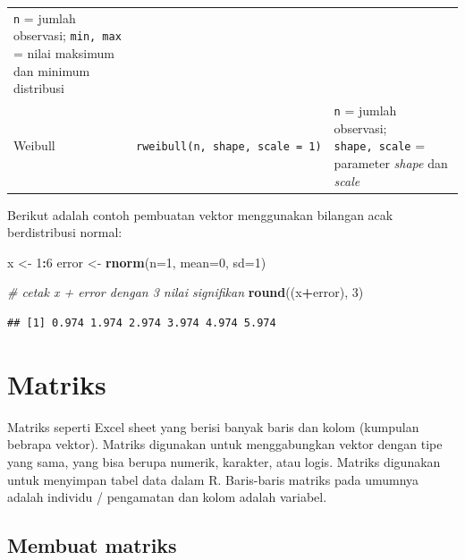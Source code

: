 \documentclass[]{book}
\newenvironment{Shaded}{\begin{snugshade}}{\end{snugshade}}
\newcommand{\CommentTok}[1]{\textcolor[rgb]{0.56,0.35,0.01}{\textit{#1}}}
\newcommand{\DataTypeTok}[1]{\textcolor[rgb]{0.13,0.29,0.53}{#1}}
\newcommand{\DecValTok}[1]{\textcolor[rgb]{0.00,0.00,0.81}{#1}}
\newcommand{\KeywordTok}[1]{\textcolor[rgb]{0.13,0.29,0.53}{\textbf{#1}}}
\newcommand{\NormalTok}[1]{#1}
\newcommand{\OperatorTok}[1]{\textcolor[rgb]{0.81,0.36,0.00}{\textbf{#1}}}
\newcommand{\StringTok}[1]{\textcolor[rgb]{0.31,0.60,0.02}{#1}}
\theoremstyle{definition}
\theoremstyle{definition}
\theoremstyle{definition}
\theoremstyle{remark}
\begin{document}
\begin{longtable}[]{@{}lll@{}}
\begin{minipage}[t]{0.65\columnwidth}
\texttt{n} = jumlah observasi; \texttt{min,\ max} = nilai maksimum dan minimum distribusi\strut
\end{minipage}\tabularnewline
\begin{minipage}[t]{0.07\columnwidth}\raggedright
Weibull\strut
\end{minipage} & \begin{minipage}[t]{0.19\columnwidth}\raggedright
\texttt{rweibull(n,\ shape,\ scale\ =\ 1)}\strut
\end{minipage} & \begin{minipage}[t]{0.65\columnwidth}\raggedright
\texttt{n} = jumlah observasi; \texttt{shape,\ scale} = parameter \emph{shape} dan \emph{scale}\strut
\end{minipage}\tabularnewline
\bottomrule
\end{longtable}

Berikut adalah contoh pembuatan vektor menggunakan bilangan acak berdistribusi normal:

\begin{Shaded}
\begin{Highlighting}[]
\NormalTok{x <-}\StringTok{ }\DecValTok{1}\OperatorTok{:}\DecValTok{6}
\NormalTok{error <-}\StringTok{ }\KeywordTok{rnorm}\NormalTok{(}\DataTypeTok{n=}\DecValTok{1}\NormalTok{, }\DataTypeTok{mean=}\DecValTok{0}\NormalTok{, }\DataTypeTok{sd=}\DecValTok{1}\NormalTok{)}

\CommentTok{# cetak x + error dengan 3 nilai signifikan}
\KeywordTok{round}\NormalTok{((x}\OperatorTok{+}\NormalTok{error), }\DecValTok{3}\NormalTok{)}
\end{Highlighting}
\end{Shaded}

\begin{verbatim}
## [1] 0.974 1.974 2.974 3.974 4.974 5.974
\end{verbatim}

\hypertarget{matriks}{%
\section{Matriks}\label{matriks}}

Matriks seperti Excel sheet yang berisi banyak baris dan kolom (kumpulan bebrapa vektor). Matriks digunakan untuk menggabungkan vektor dengan tipe yang sama, yang bisa berupa numerik, karakter, atau logis. Matriks digunakan untuk menyimpan tabel data dalam R. Baris-baris matriks pada umumnya adalah individu / pengamatan dan kolom adalah variabel.

\hypertarget{creatematrix}{%
\subsection{Membuat matriks}\label{creatematrix}}
\end{document}
